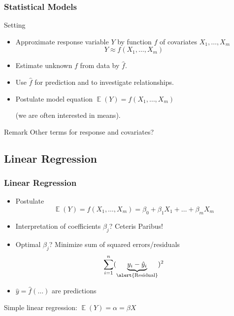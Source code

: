 \documentclass[
    utf8,
    aspectratio=169
]{beamer}  %
\DeclareMathOperator{\E}{\mathbb{E}}  %
\begin{document}
\begin{frame}
	\frametitle{Statistical Models}
	\begin{block}{Setting}
		\begin{itemize}
			\item Approximate \alert{response variable} $Y$ by function $f$ of \alert{covariates} $X_1,\dots,X_m$
			$$
				Y \approx f(X_1,\dots,X_m)
			$$
			\item Estimate unknown $f$ from data by $\hat f$.
			\item Use $\hat f$ for prediction and to investigate relationships.
			\item Postulate model equation $\E(Y) = f(X_1, \dots, X_m)$
			
			(we are often interested in means).
		\end{itemize}
	\end{block}
	
	\begin{block}{Remark}
		Other terms for response and covariates?
	\end{block}
\end{frame}

\subsection{Linear Regression}

\begin{frame}
	\frametitle{Linear Regression}
	\begin{itemize}
		\item Postulate 
		$$
			\E(Y) = f(X_1, \dots, X_m)=\beta_0 + \beta_1 X_1 + \dots + \beta_m X_m
		$$
		\item Interpretation of coefficients $\beta_j$? Ceteris Paribus!
		\item Optimal $\hat \beta_j$? Minimize sum of squared errors/residuals
		$$
			\sum_{i = 1}^n (\underbrace{y_i - \hat y_i}_{\text{\alert{Residual}}})^2 
		$$
		\item $\hat y = \hat f(\dots)$ are \alert{predictions}
	\end{itemize}

	\vfill
	
	\begin{example}
		Simple linear regression: $\E(Y)=\alpha = \beta X$
	\end{example}
\end{frame}
\end{document}
